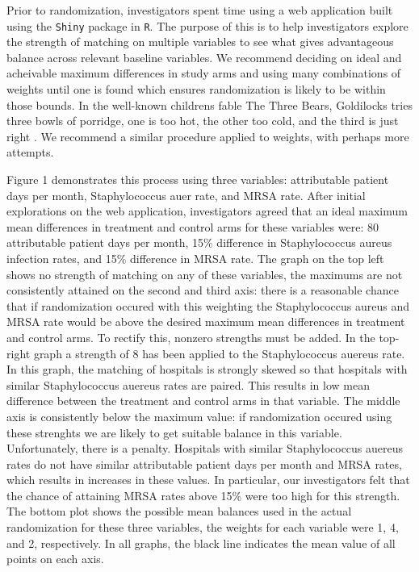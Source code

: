 \documentclass[]{sagej}
\begin{document}
Prior to randomization, investigators spent time using a web application
built using the \texttt{Shiny} package in \texttt{R}. The purpose of
this is to help investigators explore the strength of matching on
multiple variables to see what gives advantageous balance across
relevant baseline variables. We recommend deciding on ideal and
acheivable maximum differences in study arms and using many combinations
of weights until one is found which ensures randomization is likely to
be within those bounds. In the well-known childrens fable The Three
Bears, Goldilocks tries three bowls of porridge, one is too hot, the
other too cold, and the third is just right \citep{3Bears}. We recommend
a similar procedure applied to weights, with perhaps more attempts.

Figure 1 demonstrates this process using three variables: attributable
patient days per month, Staphylococcus auer rate, and MRSA rate. After
initial explorations on the web application, investigators agreed that
an ideal maximum mean differences in treatment and control arms for
these variables were: 80 attributable patient days per month, 15\%
difference in Staphylococcus aureus infection rates, and 15\% difference
in MRSA rate. The graph on the top left shows no strength of matching on
any of these variables, the maximums are not consistently attained on
the second and third axis: there is a reasonable chance that if
randomization occured with this weighting the Staphylococcus aureus and
MRSA rate would be above the desired maximum mean differences in
treatment and control arms. To rectify this, nonzero strengths must be
added. In the top-right graph a strength of 8 has been applied to the
Staphylococcus auereus rate. In this graph, the matching of hospitals is
strongly skewed so that hospitals with similar Staphylococcus auereus
rates are paired. This results in low mean difference between the
treatment and control arms in that variable. The middle axis is
consistently below the maximum value: if randomization occured using
these strenghts we are likely to get suitable balance in this variable.
Unfortunately, there is a penalty. Hospitals with similar Staphylococcus
auereus rates do not have similar attributable patient days per month
and MRSA rates, which results in increases in these values. In
particular, our investigators felt that the chance of attaining MRSA
rates above 15\% were too high for this strength. The bottom plot shows
the possible mean balances used in the actual randomization for these
three variables, the weights for each variable were 1, 4, and 2,
respectively. In all graphs, the black line indicates the mean value of
all points on each axis.
\end{document}
